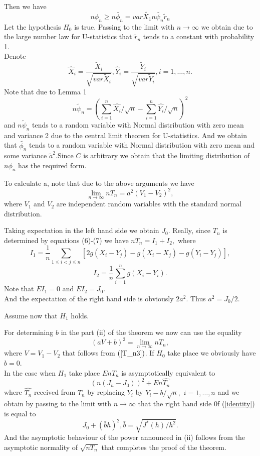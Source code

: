 \documentclass[final,11pt,3p]{elsarticle}
\begin{document}
Then we have
$$
n\phi_n\geq n\tilde{\phi_n} = var \tilde{X_1}n\tilde{\psi_n}\tilde r_n
$$
Let the hypothesis $H_0$ is true.
Passing to the limit with $n\to \infty$ we obtain due to the  large number law for U-statistics that $\tilde r_n$ tends to a constant with probability 1.\\
Denote 
$$
\hat X_i= \frac{\tilde X_i}{\sqrt{var \tilde X_i}}, \hat Y_i= \frac{\tilde Y_i}{\sqrt{var \tilde Y_i}}, i=1,\dots,n.
$$ 
Note that due to Lemma 1 
\begin{equation}\label{T_n3} 
  n\tilde\psi_n=(\sum_{i=1}^n \hat{X_{i}}/\sqrt{n}-\sum_{i=1}^n \hat{Y_{i}}/\sqrt{n})^2 
  \end{equation}
and $n\tilde \psi_n$ tends to a random variable with Normal distribution with zero mean and variance 2  due to the central limit theorem for U-statistics. And  we obtain that $\tilde{\phi_n}$ tends to a random variable with Normal distribution with zero mean and some variance $\tilde a^2$.Since $C$ is arbitrary we obtain that the limiting distribution of  $n\phi_n$ has the required form. 

 To calculate a, note that due to the above arguments we have
\begin{equation}\label{determinig a}
 \lim_{n \to \infty} nT_n =  a^2(V_1 -V_2)^2,
\end{equation}
where $V_1$ and $V_2$ are independent random variables with the standard normal distribution. 

 Taking expectation  in the left hand side we obtain $J_0$. 
Really, since $T_n$ is determined by equations (6)-(7) we have
$nT_n= I_1 +I_2,$ where
$$
I_1= \frac{1}{n}\sum_{1\leq i<j\leq n} [2 g(X_i - Y_j)-  g(X_i - X_j)-g(Y_i - Y_j)],
$$
$$
I_2 = \frac{1}{n}\sum_{i=1}^n g(X_i - Y_i).
$$
Note that  $E I_1=0$ and $E I_2 = J_0$.\\



And the expectation of  the right hand side is obviously $2a^2$. Thus  $a^2=J_0/2$. 

Assume now that $H_1$ holds.

 
For determining $b$ in the part (ii) of the theorem  we now can use the equality
 \begin{equation}\label{identity}
 (aV    +b)^2=\lim_{n \to \infty}
 nT_n,
 \end{equation}
 where $ V=V_1-V_2$ that follows from $(\ref{T_n3})$. If $H_0$ take place we obviously have $b=0$. \\
 
 In the case when $H_1$ take place $EnT_n$ is asymptotically equivalent to  
$$
(n(J_h - J_0))^2+En\hat{T_n}
$$
where $\hat{T_n}$ received from $T_n$ by replacing  $Y_i$ by $Y_i - b/\sqrt{n},$ $i=1,\dots,n$
and we obtain by passing to the limit with $n\to\infty$ that the right hand side 0f (\ref{identity}) is equal to 
$$
J_0 + (\bar bh)^2, 
\bar b =\sqrt{J^*(h)/h^2}.
$$ 
 And the asymptotic behaviour of the power announced in (ii) follows from the asymptotic normality of $\sqrt{nT_n}$ that completes the proof of the theorem.
\end{document}
